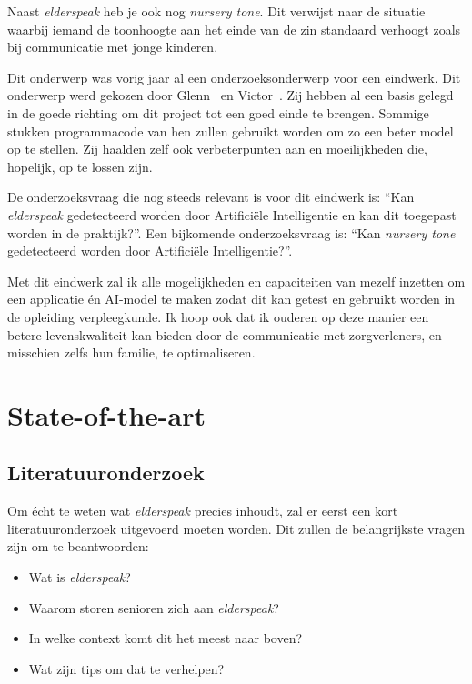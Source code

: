 Naast \textit{elderspeak} heb je ook nog \textit{nursery tone}. Dit verwijst naar de situatie waarbij iemand de toonhoogte aan het einde van de zin standaard verhoogt zoals bij communicatie met jonge kinderen.

Dit onderwerp was vorig jaar al een onderzoeksonderwerp voor een eindwerk.
Dit onderwerp werd gekozen door Glenn~\textcite{Beeckman2021} en Victor~\textcite{Standaert2021}.
Zij hebben al een basis gelegd in de goede richting om dit project tot een goed einde te brengen.
Sommige stukken programmacode van hen zullen gebruikt worden om zo een beter model op te stellen.
Zij haalden zelf ook verbeterpunten aan en moeilijkheden die, hopelijk, op te lossen zijn.

De onderzoeksvraag die nog steeds relevant is voor dit eindwerk is: ``Kan \textit{elderspeak} gedetecteerd worden door Artificiële Intelligentie en kan dit toegepast worden in de praktijk?''. Een bijkomende onderzoeksvraag is: ``Kan \textit{nursery tone} gedetecteerd worden door Artificiële Intelligentie?''.

Met dit eindwerk zal ik alle mogelijkheden en capaciteiten van mezelf inzetten om een applicatie én AI-model te maken zodat dit kan getest en gebruikt worden in de opleiding verpleegkunde.
Ik hoop ook dat ik ouderen op deze manier een betere levenskwaliteit kan bieden door de communicatie met zorgverleners, en misschien zelfs hun familie, te optimaliseren.



\section{State-of-the-art}
\label{sec:state-of-the-art}

\subsection{Literatuuronderzoek}\label{subsec:literatuuronderzoek}

Om écht te weten wat \textit{elderspeak} precies inhoudt, zal er eerst een kort literatuuronderzoek uitgevoerd moeten worden.
Dit zullen de belangrijkste vragen zijn om te beantwoorden:
\begin{itemize}
	\item Wat is \textit{elderspeak}?
	\item Waarom storen senioren zich aan \textit{elderspeak}?
	\item In welke context komt dit het meest naar boven?
	\item Wat zijn tips om dat te verhelpen?
\end{itemize}

